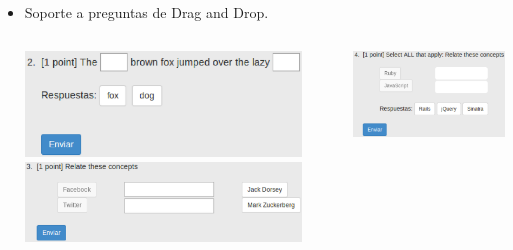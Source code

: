 \documentclass{beamer}
\begin{document}
\begin{frame}[allowframebreaks]
\begin{itemize}
    \item Soporte a preguntas de Drag and Drop.
    \bigskip
    \begin{columns}
      \begin{column}{7cm}
        \includegraphics[width=0.9\textwidth]{img/ddfi.eps}
        \newline
        \newline
        \includegraphics[width=0.9\textwidth]{img/ddmc.eps}
      \end{column}
      \begin{column}{5.5cm}
        \includegraphics[width=1\textwidth]{img/ddsm.eps}
      \end{column}
    \end{columns}
    \framebreak
    

\end{itemize}
\end{frame}
\end{document}
